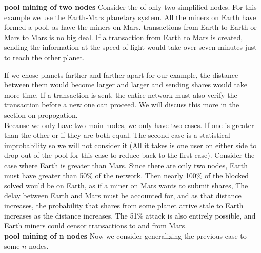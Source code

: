 \documentclass[conference]{IEEEtran}
\begin{document}
\textbf{pool mining of two nodes} Consider the of only two simplified nodes. For this example we use the Earth-Mars planetary system. All the miners on Earth have formed a pool, as have the miners on Mars. transactions from Earth to Earth or Mars to Mars is no big deal. If a transaction from Earth to Mars is created, sending the information at the speed of light would take over seven minutes just to reach the other planet. 
If we chose planets farther and farther apart for our example, the distance between them would become larger and larger and sending shares would take more time. If a transaction is sent, the entire network must also verify the transaction before a new one can proceed. We will discuss this more in the section on propogation. \cite{template}\\
Because we only have two main nodes, we only have two cases. If one is greater than the other or if they are both equal. The second case is a statistical improbability so we will not consider it (All it takes is one user on either side to drop out of the pool for this case to reduce back to the first case). Consider the case where Earth is greater than Mars. Since there are only two nodes, Earth must have greater than 50\% of the network. Then nearly 100\% of the blocked solved would be on Earth, as if a miner on Mars wants to submit shares, The delay between Earth and Mars must be accounted for, and as that distance increases, the probability that shares from some planet arrive stale to Earth increases as the distance increases. The 51\% attack is also entirely possible, and Earth miners could censor transactions to and from Mars.\\
\textbf{pool mining of n nodes} Now we consider generalizing the previous case to some $n$ nodes. 
\end{document}
